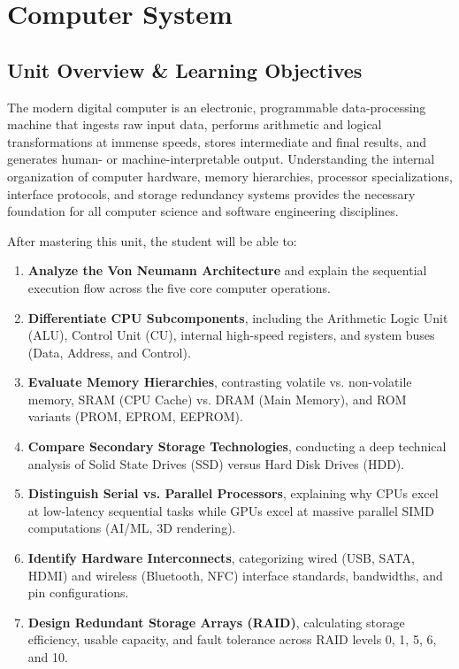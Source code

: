 \chapter{Computer System}
\label{chap:computer-system}

\section{Unit Overview \& Learning Objectives}

The modern digital computer is an electronic, programmable data-processing machine that ingests raw input data, performs arithmetic and logical transformations at immense speeds, stores intermediate and final results, and generates human- or machine-interpretable output. Understanding the internal organization of computer hardware, memory hierarchies, processor specializations, interface protocols, and storage redundancy systems provides the necessary foundation for all computer science and software engineering disciplines.

\begin{important}
After mastering this unit, the student will be able to:
\begin{enumerate}[leftmargin=1.5em]
    \item \textbf{Analyze the Von Neumann Architecture} and explain the sequential execution flow across the five core computer operations.
    \item \textbf{Differentiate CPU Subcomponents}, including the Arithmetic Logic Unit (ALU), Control Unit (CU), internal high-speed registers, and system buses (Data, Address, and Control).
    \item \textbf{Evaluate Memory Hierarchies}, contrasting volatile vs. non-volatile memory, SRAM (CPU Cache) vs. DRAM (Main Memory), and ROM variants (PROM, EPROM, EEPROM).
    \item \textbf{Compare Secondary Storage Technologies}, conducting a deep technical analysis of Solid State Drives (SSD) versus Hard Disk Drives (HDD).
    \item \textbf{Distinguish Serial vs. Parallel Processors}, explaining why CPUs excel at low-latency sequential tasks while GPUs excel at massive parallel SIMD computations (AI/ML, 3D rendering).
    \item \textbf{Identify Hardware Interconnects}, categorizing wired (USB, SATA, HDMI) and wireless (Bluetooth, NFC) interface standards, bandwidths, and pin configurations.
    \item \textbf{Design Redundant Storage Arrays (RAID)}, calculating storage efficiency, usable capacity, and fault tolerance across RAID levels 0, 1, 5, 6, and 10.
\end{enumerate}
\end{important}

